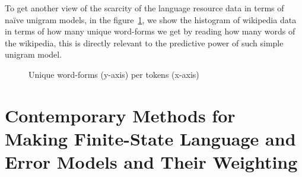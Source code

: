 \documentclass[a4paper,12pt]{article}
\begin{document}
To get another view of the scarcity of the language resource data in terms
of naïve unigram models, in the figure~\ref{fig:forms-vs-tokens}, we show the
histogram of wikipedia data in terms of how many unique word-forms we get by
reading how many words of the wikipedia, this is directly relevant to the
predictive power of such simple unigram model.

\begin{figure}
    \centering
    \caption{Unique word-forms (y-axis) per tokens (x-axis)
    \label{fig:forms-vs-tokens}}
\end{figure}

\section{Contemporary Methods for Making Finite-State Language and Error Models
and Their Weighting}
\label{sec:methods}
\end{document}
